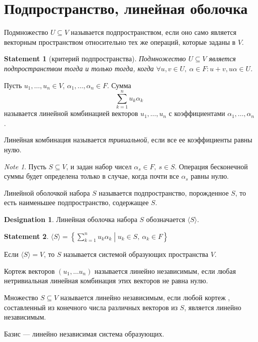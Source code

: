 \documentclass[11pt]{book}
\newcommand{\slim}{\sum\limits}
\theoremstyle{definition}
\theoremstyle{plain}
\theoremstyle{plain}
\newtheorem{st}{Statement}
\theoremstyle{definition}
\newtheorem*{name}{Designation}
\theoremstyle{remark}
\newtheorem*{note}{Note}
\begin{document}
\section{Подпространство, линейная оболочка}
\begin{defn}
    Подмножество  $ U \subseteq V$ называется подпространством, если оно само является векторным пространством относительно тех же операций, которые заданы в $ V$.
\end{defn}
\begin{st}[критерий подпространства]
    Подмножество $ U \subseteq V$ является подпространством тогда и только тогда, когда $ \forall u, v \in U, ~ \alpha \in F: u + v, u \alpha \in U$.
\end{st}
\begin{defn}
    Пусть  $ u_1, \ldots , u_n \in V$, $ \alpha_1, \ldots , \alpha_n \in F$. Сумма
    \[
    \sum _{k = 1}^{n} u_k \alpha_k
    \] 
    называется линейной комбинацией векторов $ u_1, \ldots , u_n$ с коэффициентами $ \alpha_1, \ldots , \alpha _n$.

    Линейная комбинация называется {\it тривиальной}, если все ее коэффициенты равны нулю.
\end{defn}
\begin{note}
    Пусть $ S \subseteq V$, и задан набор чисел $ \alpha_s \in F, ~s \in S$. Операция бесконечной суммы будет определена только в случае, когда почти все $ \alpha _s$ равны нулю. 
\end{note}
\begin{defn}
    Линейной оболочкой  набора $ S$ называется подпространство, порожденное   $ S$, то есть наименьшее подпространство, содержащее  $ S$.
     \begin{name}
        Линейная оболочка  набора $ S$ обозначается   $ \langle S \rangle$.
    \end{name}
\end{defn}
\begin{st}
    $ \langle S \rangle = \left\{ \slim_{k=1}^{n} u_k \alpha_k \middle| u_k\in S, ~ \alpha_k \in F \right\} $
\end{st}
\begin{defn}
    Если $ \langle S \rangle = V$, то $ S$ называется системой образующих пространства  $ V$.
\end{defn}
\begin{defn}
    Кортеж векторов $ (u_1, \ldots u_n)$ называется линейно независимым, если любая нетривиальная линейная комбинация этих векторов не равна нулю.

    Множество $ S \subseteq V$  называется линейно независимым, если любой кортеж  , составленный из конечного числа различных векторов из $ S$, является линейно независимым.
\end{defn}
\begin{defn}
    Базис --- линейно независимая система образующих.
\end{defn}
\end{document}
